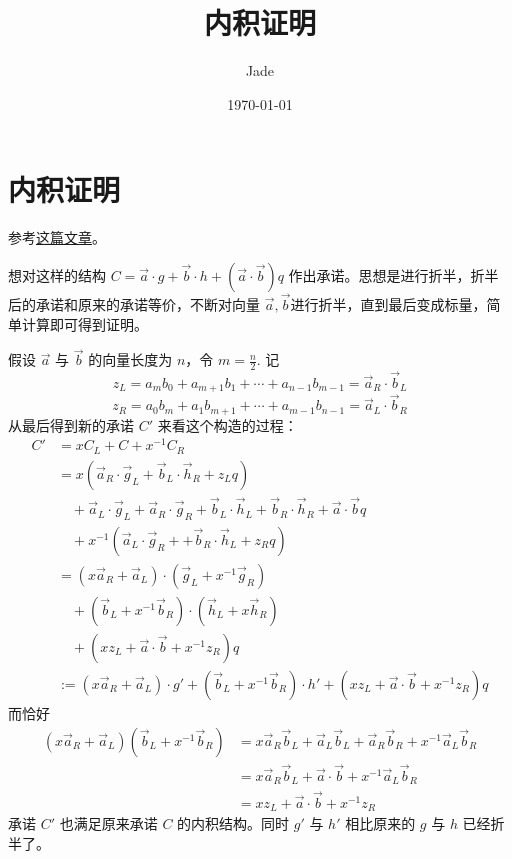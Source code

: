 \documentclass[10pt]{ctexart}
\title{内积证明}
\author{Jade}
\date{\today}
\begin{document}
\maketitle
\tableofcontents
\section{内积证明}
参考\href{https://dankradfeist.de/ethereum/2021/11/18/inner-product-arguments-mandarin.html}{这篇文章}。

想对这样的结构 $C = \vec{a} \cdot g + \vec{b} \cdot h + (\vec{a} \cdot \vec{b})  q$ 作出承诺。思想是进行折半，折半后的承诺和原来的承诺等价，不断对向量 $\vec{a}, \vec{b}$进行折半，直到最后变成标量，简单计算即可得到证明。

假设 $\vec{a}$ 与 $\vec{b}$ 的向量长度为 $n$，令 $m = \frac{n}{2}$. 记
\begin{equation*}
    z_L = a_mb_0 + a_{m+1}b_1 + \cdots + a_{n-1}b_{m-1} = \vec{a}_R\cdot \vec{b}_L
\end{equation*}
\begin{equation*}
    z_R = a_0b_m + a_{1}b_{m+1} + \cdots + a_{m-1}b_{n-1} = \vec{a}_L\cdot \vec{b}_R
\end{equation*}
从最后得到新的承诺 $C'$ 来看这个构造的过程：
\begin{align*}
    C' & = x C_L + C + x^{-1}C_R \\
    & = x (\vec{a}_R \cdot \vec{g}_L + \vec{b}_L \cdot \vec{h}_R + z_L q) \\
    & \quad + \vec{a}_L \cdot \vec{g}_L + \vec{a}_R \cdot \vec{g}_R + \vec{b}_L \cdot \vec{h}_L + \vec{b}_R \cdot \vec{h}_R + \vec{a} \cdot \vec{b}q \\
    & \quad + x^{-1}(\vec{a}_L \cdot \vec{g}_R +  + \vec{b}_R \cdot \vec{h}_L + z_R q)\\
    & = (x\vec{a}_R + \vec{a}_L)\cdot(\vec{g}_L + x^{-1}\vec{g}_R) \\
    & \quad + (\vec{b}_L + x^{-1}\vec{b}_R)\cdot(\vec{h}_L + x \vec{h}_R) \\
    & \quad + (x z_L + \vec{a} \cdot \vec{b} + x^{-1}z_R)q \\
    & := (x\vec{a}_R + \vec{a}_L) \cdot g' + (\vec{b}_L + x^{-1}\vec{b}_R) \cdot h' + (x z_L + \vec{a} \cdot \vec{b} + x^{-1}z_R)q
\end{align*}
而恰好
\begin{align*}
    (x\vec{a}_R + \vec{a}_L)(\vec{b}_L + x^{-1}\vec{b}_R) & = x \vec{a}_R \vec{b}_L + \vec{a}_L\vec{b}_L + \vec{a}_R\vec{b}_R + x^{-1}\vec{a}_L\vec{b}_R\\
    & = x \vec{a}_R \vec{b}_L + \vec{a} \cdot \vec{b} + x^{-1}\vec{a}_L\vec{b}_R \\
    & = x z_L + \vec{a} \cdot \vec{b} + x^{-1}z_R
\end{align*}
承诺 $C'$ 也满足原来承诺 $C$ 的内积结构。同时 $g'$ 与 $h'$ 相比原来的 $g$ 与 $h$ 已经折半了。 
\end{document}
